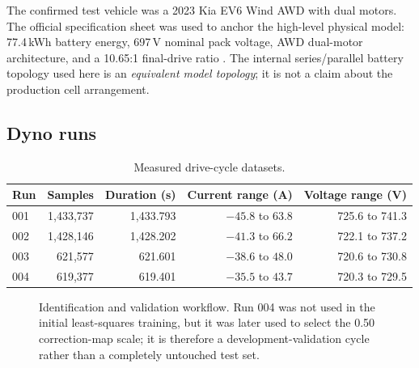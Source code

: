 \documentclass[11pt,letterpaper]{article}
\newcommand{\SI}[2]{#1\,#2}
\begin{document}
The confirmed test vehicle was a 2023 Kia EV6 Wind AWD with dual motors. The
official specification sheet was used to anchor the high-level physical model:
\SI{77.4}{kWh} battery energy, \SI{697}{V} nominal pack voltage, AWD dual-motor
architecture, and a 10.65:1 final-drive ratio \cite{kia2023}. The internal
series/parallel battery topology used here is an \emph{equivalent model
topology}; it is not a claim about the production cell arrangement.

\subsection{Dyno runs}

\begin{table}[H]
\centering
\caption{Measured drive-cycle datasets.}
\begin{tabular}{lrrrr}
\toprule
Run & Samples & Duration (s) & Current range (A) & Voltage range (V) \\
\midrule
001 & 1,433,737 & 1,433.793 & $-45.8$ to $63.8$ & 725.6 to 741.3 \\
002 & 1,428,146 & 1,428.202 & $-41.3$ to $66.2$ & 722.1 to 737.2 \\
003 & 621,577   & 621.601   & $-38.6$ to $48.0$ & 720.6 to 730.8 \\
004 & 619,377   & 619.401   & $-35.5$ to $43.7$ & 720.3 to 729.5 \\
\bottomrule
\end{tabular}
\end{table}

\begin{figure}[!htbp]
\centering
{}
\caption{Identification and validation workflow. Run 004 was not used in the initial least-squares training, but it was later used to select the 0.50 correction-map scale; it is therefore a development-validation cycle rather than a completely untouched test set.}
\end{figure}
\end{document}
